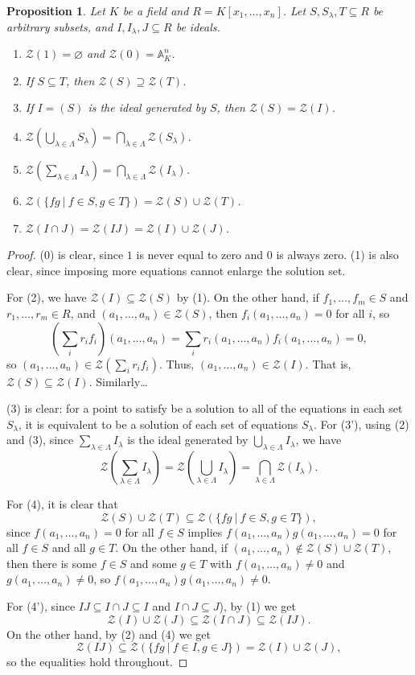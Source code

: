 \documentclass{amsart}[12pt]
\newcommand{\A}{\mathbb{A}}
\newcommand{\cZ}{\mathcal{Z}}
\numberwithin{equation}{section}
\theoremstyle{plain} %
\newtheorem{prop}[equation]{Proposition}
\theoremstyle{definition}
\theoremstyle{remark}
\begin{document}
 
 \begin{prop}
  Let $K$ be a field and $R=K[x_1, \dots,x_n]$. Let $S, S_{\lambda}, T \subseteq R$ be arbitrary subsets, and $I, I_\lambda, J\subseteq R$ be ideals.
  \begin{enumerate}
  \item[(0)] $\cZ(1) = \varnothing$ and $\cZ(0) = \A^n_K$.
  \item If $S\subseteq T$, then $\cZ(S) \supseteq \cZ(T)$.
  \item If $I= (S)$ is the ideal generated by $S$, then $\cZ(S) = \cZ(I)$.
  \item $\displaystyle \cZ(\bigcup_{\lambda \in \Lambda} S_\lambda)=\bigcap_{\lambda \in \Lambda} \cZ(S_\lambda)$.
  \item[(3')] $\displaystyle \cZ(\sum_{\lambda \in \Lambda} I_\lambda)=\bigcap_{\lambda \in \Lambda} \cZ(I_\lambda)$.
  \item $\displaystyle \cZ(\{fg \ | \ f\in S,  g\in T\}) = \cZ(S) \cup \cZ(T)$.

  \item[(4')]  $\displaystyle \cZ(I \cap J)=\cZ(IJ) = \cZ(I) \cup \cZ(J)$.
\end{enumerate}
\end{prop}
\begin{proof}
(0) is clear, since $1$ is never equal to zero and $0$ is always zero. (1) is also clear, since imposing more equations cannot enlarge the solution set.

For (2), we have $\cZ(I) \subseteq \cZ(S)$ by (1). On the other hand, if $f_1,\dots,f_m\in S$ and $r_1,\dots,r_m\in R$, and $(a_1,\dots,a_n)\in \cZ(S)$, then $f_i(a_1,\dots,a_n)=0$ for all $i$, so \[(\sum_i r_i f_i)(a_1,\dots,a_n) = \sum_i r_i(a_1,\dots,a_n) f_i(a_1,\dots,a_n) = 0,\] so $(a_1,\dots,a_n)\in \cZ(\sum_i r_i f_i)$. Thus, $(a_1,\dots,a_n)\in \cZ(I)$. That is, $\cZ(S) \subseteq \cZ(I)$. Similarly\dots

(3) is clear: for a point to satisfy be a solution to all of the equations in each set $S_\lambda$, it is equivalent to be a solution of each set of equations $S_\lambda$. For (3'), using (2) and (3), since $\sum_{\lambda \in \Lambda} I_\lambda$ is the ideal generated by $\bigcup_{\lambda\in\Lambda} I_\lambda$, we have
\[ \cZ(\sum_{\lambda \in \Lambda} I_\lambda) =  \cZ(\bigcup_{\lambda \in \Lambda} I_\lambda) = \bigcap_{\lambda \in \Lambda} \cZ(I_\lambda).\]

For (4), it is clear that \[\cZ(S) \cup \cZ(T) \subseteq \cZ(\{fg \ | \ f\in S,  g\in T\}),\] since $f(a_1,\dots,a_n)=0$ for all $f\in S$ implies $f(a_1,\dots,a_n) g(a_1,\dots,a_n)=0$ for all $f\in S$ and all $g\in T$. On the other hand, if $(a_1,\dots,a_n)\notin \cZ(S) \cup \cZ(T)$, then there is some $f\in S$ and some $g\in T$ with $f(a_1,\dots,a_n) \neq 0$ and $g(a_1,\dots,a_n)\neq 0$, so $f(a_1,\dots,a_n) g(a_1,\dots,a_n)\neq 0$.

For (4'), since $IJ \subseteq I \cap J \subseteq I$ and $I \cap J \subseteq J$), by (1) we get
\[ \cZ(I) \cup \cZ(J) \subseteq \cZ(I \cap J) \subseteq  \cZ(IJ).\] On the other hand, by (2) and (4) we get
\[ \cZ(IJ) \subseteq \cZ( \{ fg \ | \ f\in I , g\in J\}) = \cZ(I) \cup \cZ(J),\]
so the equalities hold throughout.
\end{proof}
\end{document}
